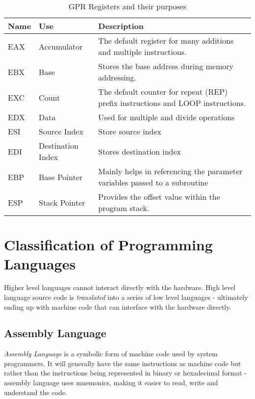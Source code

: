 \begin{table}[H]
    \centering
    {\RaggedRight
    \begin{tabular}{p{}p{}p{}}
    \textbf{Name} & \textbf{Use} & \textbf{Description}\\
    \hline
    \hline
    EAX & Accumulator & The default register for many additions and multiple instructions.\\
    \hline
    EBX & Base & Stores the base address during memory addressing.\\
    \hline
    EXC & Count & The default counter for repeat (REP) prefix instructions and LOOP instructions.\\
    \hline
    EDX & Data & Used for multiple and divide operations\\
    \hline
    ESI & Source Index & Store source index \\
    \hline
    EDI & Destination Index & Stores destination index\\
    \hline
    EBP & Base Pointer & Mainly helps in referencing the parameter variables passed to a subroutine\\
    \hline
    ESP & Stack Pointer & Provides the offset value within the program stack.\\
    \hline
    \end{tabular}
    } %
    \caption{GPR Registers and their purposes}
\end{table}

\section{Classification of Programming Languages}
Higher level languages cannot interact directly with the hardware. High level language source code is \textit{translated} into a series of low level languages - ultimately ending up with machine code that can interface with the hardware directly. 

\subsection{Assembly Language}
\textit{Assembly Language} is a symbolic form of machine code used by system programmers. It will generally have the same instructions as machine code but rather than the instructions being represented in binary or hexadecimal format - assembly language uses mnemonics, making it easier to read, write and understand the code.\\

